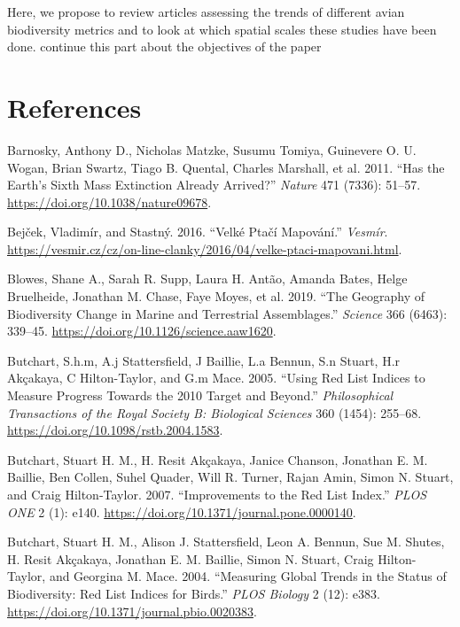 \documentclass[
  12pt,
  oneside]{report}
\begin{document}
Here, we propose to review articles assessing the trends of different avian biodiversity metrics and to look at which spatial scales these studies have been done. continue this part about the objectives of the paper

\hypertarget{references}{%
\chapter*{References}\label{references}}

\singlespacing

\hypertarget{refs}{}
\leavevmode\hypertarget{ref-barnosky_has_2011}{}%
Barnosky, Anthony D., Nicholas Matzke, Susumu Tomiya, Guinevere O. U. Wogan, Brian Swartz, Tiago B. Quental, Charles Marshall, et al. 2011. ``Has the Earth's Sixth Mass Extinction Already Arrived?'' \emph{Nature} 471 (7336): 51--57. \url{https://doi.org/10.1038/nature09678}.

\leavevmode\hypertarget{ref-bejcek_velke_2016}{}%
Bejček, Vladimír, and Stastný. 2016. ``Velké Ptačí Mapování.'' \emph{Vesmír}. \url{https://vesmir.cz/cz/on-line-clanky/2016/04/velke-ptaci-mapovani.html}.

\leavevmode\hypertarget{ref-blowes_geography_2019}{}%
Blowes, Shane A., Sarah R. Supp, Laura H. Antão, Amanda Bates, Helge Bruelheide, Jonathan M. Chase, Faye Moyes, et al. 2019. ``The Geography of Biodiversity Change in Marine and Terrestrial Assemblages.'' \emph{Science} 366 (6463): 339--45. \url{https://doi.org/10.1126/science.aaw1620}.

\leavevmode\hypertarget{ref-butchart_using_2005}{}%
Butchart, S.h.m, A.j Stattersfield, J Baillie, L.a Bennun, S.n Stuart, H.r Akçakaya, C Hilton-Taylor, and G.m Mace. 2005. ``Using Red List Indices to Measure Progress Towards the 2010 Target and Beyond.'' \emph{Philosophical Transactions of the Royal Society B: Biological Sciences} 360 (1454): 255--68. \url{https://doi.org/10.1098/rstb.2004.1583}.

\leavevmode\hypertarget{ref-butchart_improvements_2007}{}%
Butchart, Stuart H. M., H. Resit Akçakaya, Janice Chanson, Jonathan E. M. Baillie, Ben Collen, Suhel Quader, Will R. Turner, Rajan Amin, Simon N. Stuart, and Craig Hilton-Taylor. 2007. ``Improvements to the Red List Index.'' \emph{PLOS ONE} 2 (1): e140. \url{https://doi.org/10.1371/journal.pone.0000140}.

\leavevmode\hypertarget{ref-butchart_measuring_2004}{}%
Butchart, Stuart H. M., Alison J. Stattersfield, Leon A. Bennun, Sue M. Shutes, H. Resit Akçakaya, Jonathan E. M. Baillie, Simon N. Stuart, Craig Hilton-Taylor, and Georgina M. Mace. 2004. ``Measuring Global Trends in the Status of Biodiversity: Red List Indices for Birds.'' \emph{PLOS Biology} 2 (12): e383. \url{https://doi.org/10.1371/journal.pbio.0020383}.
\end{document}
